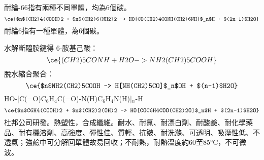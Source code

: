 \documentclass[a4paper,12pt]{report}
\begin{document}
\begin{itemize}
\begin{itemize}
耐綸-66指有兩種不同單體，均為6個碳。
\[\ce{$n$(CH2)4(COOH)2 + $n$(CH2)6(NH2)2 -> HO[CO(CH2)4CONH(CH2)6NH]$_n$H + $(2n-1)$H2O}\]
耐綸6指有一種單體，為6個碳。

水解斷醯胺鍵得 6-胺基己酸：
\[\ce{(CH2)5CONH + H2O -> NH2(CH2)5COOH}\]
脫水縮合聚合：
\[\ce{$n$NH2(CH2)5COOH -> H[NH(CH2)5CO]$_n$OH + $(n-1)$H2O}\]
HO-[C(=O)C$_6$H$_4$C(=O)-N(H)C$_6$H$_4$N(H)]$_n$-H
\[\ce{$n$C6H4(COOH)2 + $n$(CH2)2(OH)2 -> HO[COC6H4COO(CH2)2O]$_n$H + $(2n-1)$H2O}\]
杜邦公司研發。熱塑性，合成纖維。耐水、耐氯、耐漂白劑、耐酸鹼、耐化學藥品、耐有機溶劑、高強度、彈性佳、質輕、抗皺、耐洗滌、可透明、吸溼性低、不透氣；強鹼中可分解回單體故易回收；不耐熱，耐熱溫度約60至85°C，不可微波。


\end{itemize}
\end{itemize}
\end{document}
